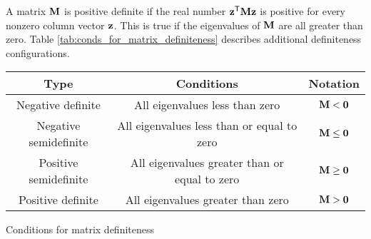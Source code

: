 A matrix $\mathbf{M}$ is positive definite if the real number
$\mathbf{z}^\mathsf{T}\mathbf{M}\mathbf{z}$ is positive for every nonzero column vector $\mathbf{z}$.
This is true if the eigenvalues of $\mathbf{M}$ are all greater than zero. Table
\ref{tab:conds_for_matrix_definiteness} describes additional definiteness
configurations.
\begin{booktable}
  \begin{tabular}{|ccc|}
    \hline
    \rowcolor{headingbg}
    \textbf{Type} & \textbf{Conditions} & \textbf{Notation} \\
    \hline
    Negative definite & All eigenvalues less than zero & $\mathbf{M} < \mathbf{0}$ \\
    Negative semidefinite & All eigenvalues less than or equal to zero &
      $\mathbf{M} \leq \mathbf{0}$ \\
    Positive semidefinite & All eigenvalues greater than or equal to zero &
      $\mathbf{M} \geq \mathbf{0}$ \\
    Positive definite & All eigenvalues greater than zero &
      $\mathbf{M} > \mathbf{0}$ \\
    \hline
  \end{tabular}
  \caption{Conditions for matrix definiteness}
  \label{tab:conds_for_matrix_definiteness}
\end{booktable}
